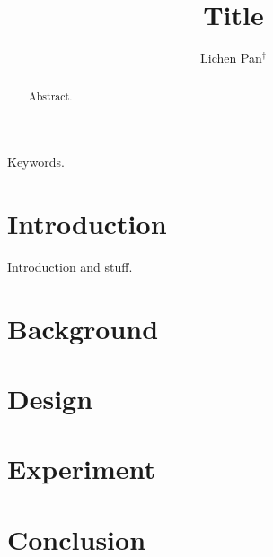 \documentclass[conference]{IEEEtran}
\begin{document}
\title{Title}


\author{Lichen Pan$^\dagger$}

\maketitle

\begin{abstract}
	Abstract.
\end{abstract}

\begin{IEEEkeywords}
	Keywords.
\end{IEEEkeywords}

\section{Introduction}
\label{sec:introduction}
Introduction and stuff\cite{IEEEhowto:IEEEtranpage}.


\section{Background}
\label{sec:background}

\section{Design}
\label{sec:design}

\section{Experiment}
\label{sec:experiment}

\section{Conclusion}
\label{sec:conclusion}



\end{document}
